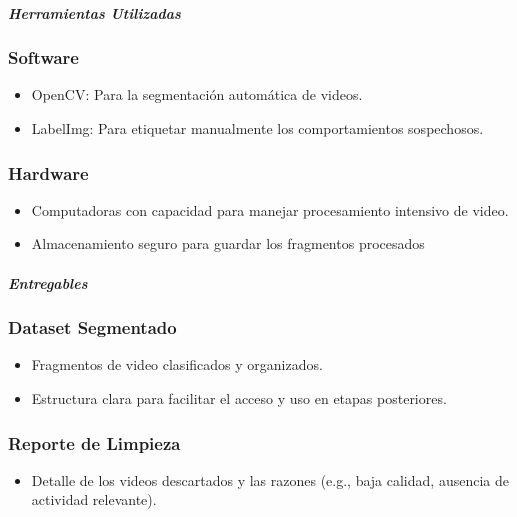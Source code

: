 \documentclass[listof=nochaptergap,12pt,times,authoryear]{report}
\begin{document}
\paragraph{\textit{Herramientas Utilizadas}}

\subsubsection{Software}
\begin{itemize}
    \item OpenCV: Para la segmentación automática de videos.
    \item LabelImg: Para etiquetar manualmente los comportamientos sospechosos.
\end{itemize}

\subsubsection{Hardware}
\begin{itemize}
    \item Computadoras con capacidad para manejar procesamiento intensivo de video.
    \item Almacenamiento seguro para guardar los fragmentos procesados
\end{itemize}

\paragraph{\textit{Entregables}}

\subsubsection{Dataset Segmentado}
\begin{itemize}
    \item Fragmentos de video clasificados y organizados.
    \item Estructura clara para facilitar el acceso y uso en etapas posteriores.
\end{itemize}


\subsubsection{Reporte de Limpieza}
\begin{itemize}
    \item Detalle de los videos descartados y las razones (e.g., baja calidad, ausencia de actividad relevante).
\end{itemize}
\end{document}
